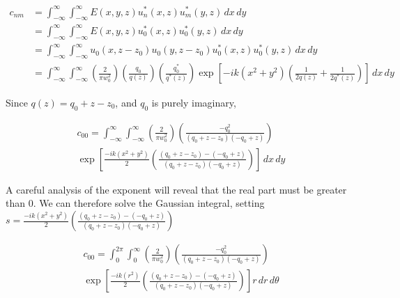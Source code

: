 \newcommand{\intinfxy}[1]{\int^{\infty}_{- \infty} \int^{\infty}_{- \infty} #1 \,dx \,dy}
\newcommand{\intinfrt}[1]{\int^{2 \pi}_{0} \int^{\infty}_{0} #1 r \,dr \,d\theta}


\begin{align}
    c_{nm} &= \intinfxy{
    E(x,y,z) u_n^*(x,z)u_m^*(y,z)}
\\  &= \intinfxy{
    E(x,y,z) u_0^*(x,z)u_0^*(y,z)}
\\  &= \intinfxy{
    u_0(x,z-z_0)u_0(y,z-z_0) u_0^*(x,z)u_0^*(y,z)}
\\  &= \intinfxy{ \left( \frac{2}{\pi w^2_0} \right) \left( \frac{q_0}{q(z)} \right)
    \left( \frac{q^*_0}{q^*(z)} \right) \exp \left[-ik \left( x^2 + y^2  \right)
    \left( \frac{1}{2q(z)} + \frac{1}{2q^*(z)} \right) \right]}
\end{align}

Since $q(z) = q_0 + z - z_0$, and $q_0$ is purely imaginary,


\begin{multline}
    c_{00} = \intinfxy{ \left( \frac{2}{\pi w^2_0} \right)
    \left( \frac{-q^2_0}{(q_0+z-z_0)(-q_0+z)} \right) \\
    \exp \left[
    \frac{-ik \left( x^2 + y^2  \right)}{2} \left( \frac{(q_0+z-z_0)-(-q_0+z)}{(q_0+z-z_0)(-q_0+z)} \right)
    \right]}
\end{multline}

A careful analysis of the exponent will reveal that the real part must be greater than $0$.
We can therefore solve the Gaussian integral, setting $s = \frac{-ik \left( x^2 + y^2
\right)}{2} \left( \frac{(q_0+z-z_0)-(-q_0+z)}{(q_0+z-z_0)(-q_0+z)} \right)$

\begin{multline}
    c_{00} = \intinfrt{ \left( \frac{2}{\pi w^2_0} \right)
    \left( \frac{-q^2_0}{(q_0+z-z_0)(-q_0+z)} \right) \\
    \exp \left[
    \frac{-ik \left( r^2  \right)}{2} \left( \frac{(q_0+z-z_0)-(-q_0+z)}{(q_0+z-z_0)(-q_0+z)} \right)
    \right]}
\end{multline}

